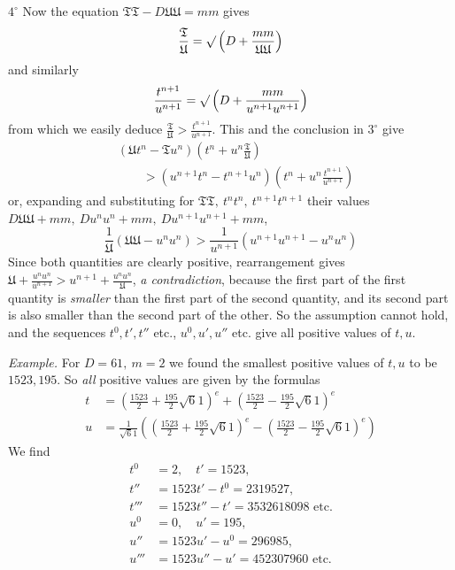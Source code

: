 \(4^\circ\) Now the equation \(\mathfrak{TT}-D\mathfrak{UU}=mm\) gives
\[
\frac{\mathfrak{T}}{\mathfrak{U}}=\surd\left(D+\frac{mm}{\mathfrak{UU}}\right)
\]
and similarly
\[
\frac{t^{n+1}}{u^{n+1}}=\surd\left(D+\frac{mm}{u^{n+1}u^{n+1}}\right)
\]
from which we easily deduce \(\frac{\mathfrak{T}}{\mathfrak{U}}>\frac{t^{n+1}}{u^{n+1}}\). This and the conclusion in \(3^\circ\) give
\[
\begin{aligned}&(\mathfrak{U}t^n-\mathfrak{T}u^n)\left(t^n+u^n\frac{\mathfrak{T}}{\mathfrak{U}}\right)\\&\qquad>(u^{n+1}t^n-t^{n+1}u^n)\left(t^n+u^n\frac{t^{n+1}}{u^{n+1}}\right)\end{aligned}
\]
or, expanding and substituting for \(\mathfrak{TT},\ t^n t^n,\ t^{n+1}t^{n+1}\) their values \(D\mathfrak{UU}+mm,\allowbreak\ Du^n u^n+mm,\allowbreak\ Du^{n+1}u^{n+1}+mm\),
\[
\frac1{\mathfrak{U}}(\mathfrak{UU}-u^n u^n)>\frac1{u^{n+1}}(u^{n+1}u^{n+1}-u^n u^n)
\]
Since both quantities are clearly positive, rearrangement gives \(\mathfrak{U}+\frac{u^n u^n}{u^{n+1}}>u^{n+1}+\frac{u^n u^n}{\mathfrak{U}}\), \textit{a contradiction}, because the first part of the first quantity is \textit{smaller}
than the first part of the second quantity, and its second part is also smaller than the second part of the other. So the assumption cannot hold, and the sequences \(t^0,t',t''\) etc., \(u^0,u',u''\) etc. give all positive values of \(t,u\).

\textit{Example.} For \(D=61,\ m=2\) we found the smallest positive values of \(t,u\) to be \(1523,195\). So \textit{all} positive values are given by the formulas
\[
\begin{aligned}
t&=\left(\frac{1523}{2}+\frac{195}{2}\surd61\right)^e+\left(\frac{1523}{2}-\frac{195}{2}\surd61\right)^e\\
u&=\frac1{\surd61}\left(\left(\frac{1523}{2}+\frac{195}{2}\surd61\right)^e-\left(\frac{1523}{2}-\frac{195}{2}\surd61\right)^e\right)
\end{aligned}
\]
We find
\[
\begin{aligned}
t^0&=2,\quad t'=1523,\\
t''&=1523t'-t^0=2319527,\\
t'''&=1523t''-t'=3532618098\text{ etc.}\\
u^0&=0,\quad u'=195,\\
u''&=1523u'-u^0=296985,\\
u'''&=1523u''-u'=452307960\text{ etc.}
\end{aligned}
\]
